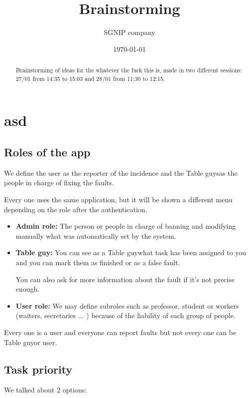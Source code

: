 \documentclass{article}
\title{Brainstorming}
\date{\today}
\author{SGNIP company}
\newcommand{\tbg}{Table guy}
\newcommand{\tbgs}{Table guys}
\begin{document}
\maketitle

\pagestyle{plain}

\begin{abstract} Brainstorming of ideas for the whatever the fuck this is, made in two different sessions: 27/01 from 14:35 to 15:03 and 28/01 from 11:30 to 12:15.
\end{abstract}

\section{asd}

\subsection{Roles of the app}
We define the user as the reporter of the incidence and the \tbgs as the people in charge of fixing the faults.


Every one uses the same application, but it will be shown a different menu depending on the role after the authentication.

\begin{itemize}
\item \textbf{Admin role: } The person or people in charge of banning and modifying manually what was automatically set by the system.

\item\textbf{\tbg:} You can see as a \tbg what task has been assigned to you and you can mark them as finished or as a false fault.

You can also ask for more information about the fault if it's not precise enough.

\item \textbf{User role: }  We may define subroles such as professor, student or workers (waiters, secretaries ... ) because of the liability of each group of people.

\end{itemize}

Every one is a user and everyone can report faults but not  every one can be \tbg or user.

\subsection{Task priority}
We talked about 2 options:
\end{document}
